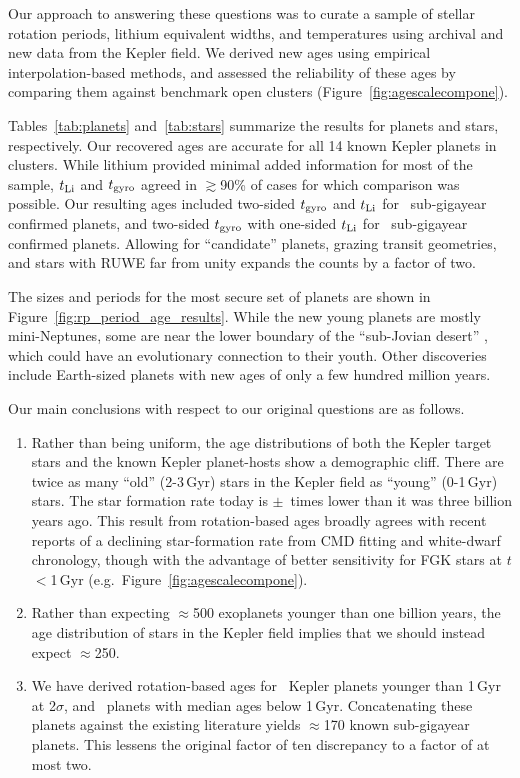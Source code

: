 \documentclass[11pt,twocolumn,tighten,linenumbers]{aastex63}
\begin{document}
Our approach to answering these questions was to curate a sample of
stellar rotation periods, lithium equivalent widths, and temperatures
using archival and new data from the Kepler field.  We derived new
ages using empirical interpolation-based methods, and assessed the
reliability of these ages by comparing them against benchmark open
clusters (Figure~\ref{fig:agescalecompone}).

Tables~\ref{tab:planets} and~\ref{tab:stars} summarize the results for
planets and stars, respectively.  Our recovered ages are accurate for
all 14 known Kepler planets in clusters.  While lithium provided
minimal added information for most of the sample, $t_{\rm Li}$ and
$t_{\rm gyro}$ agreed in $\gtrsim$90\% of cases for which comparison
was possible.  Our resulting ages included two-sided $t_{\rm gyro}$
and $t_{\rm Li}$ for \ltonegyrhighqconfirmedtwosided\ sub-gigayear
confirmed planets, and two-sided $t_{\rm gyro}$ with one-sided $t_{\rm
Li}$ for \ltonegyrhighqconfirmedonesided\ sub-gigayear confirmed
planets.  Allowing for ``candidate'' planets, grazing transit
geometries, and stars with RUWE far from unity expands the counts by a
factor of two.

The sizes and periods for the most secure set of planets are shown in
Figure~\ref{fig:rp_period_age_results}.   While the new young planets
are mostly mini-Neptunes, some are near the lower boundary of the
``sub-Jovian desert'' \citep{Owen2018}, which could have an
evolutionary connection to their youth.  Other discoveries include
Earth-sized planets with new ages of only a few hundred million years.  

Our main conclusions with respect to our original questions are as
follows.

\begin{enumerate}[leftmargin=*,topsep=0pt,itemsep=-1ex,partopsep=1ex,parsep=1ex]
  \item Rather than being uniform, the age distributions of both the
    Kepler target stars and the known Kepler planet-hosts show a
    demographic cliff.  There are twice as many ``old'' (2-3\,Gyr)
    stars in the Kepler field as ``young'' (0-1\,Gyr) stars.  The star
    formation rate today is \ratiosfr$\pm$\uncratiosfr\ times lower
    than it was three billion years ago.  This result from
    rotation-based ages broadly agrees with recent reports of a
    declining star-formation rate from CMD fitting and white-dwarf
    chronology, though with the advantage of better sensitivity for
    FGK stars at $t$$<$1\,Gyr (e.g.~Figure~\ref{fig:agescalecompone}).
  \item Rather than expecting $\approx$500 exoplanets younger than one
    billion years, the age distribution of stars in the Kepler field
    implies that we should instead expect $\approx$250.
  \item We have derived rotation-based ages for \nplyounggyrotwosigma\
    Kepler planets younger than 1\,Gyr at 2$\sigma$, and
    \nplyounggyro\ planets with median ages below 1\,Gyr.
    Concatenating these planets against the existing literature yields
    $\approx$170 known sub-gigayear planets.  This lessens the
    original factor of ten discrepancy to a factor of at most two.
\end{enumerate}
\end{document}
